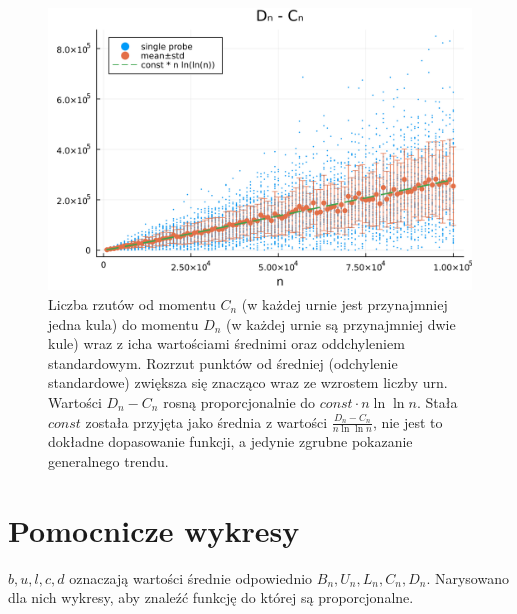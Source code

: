 \documentclass{article}
\begin{document}
\begin{figure}
    \centering
    \includegraphics[width=1.0\textwidth]{../results/D_n-C_n.png}
    \caption{Liczba rzutów od momentu $C_n$ (w każdej urnie jest przynajmniej jedna kula) do momentu $D_n$ (w każdej urnie są przynajmniej dwie kule) wraz z icha wartościami średnimi oraz oddchyleniem standardowym. Rozrzut punktów od średniej (odchylenie standardowe) zwiększa się znacząco wraz ze wzrostem liczby urn.  Wartości $D_n - C_n$ rosną proporcjonalnie do $const \cdot n \ln \ln n$. Stała $const$ została przyjęta jako średnia z wartości $\frac{D_n - C_n}{n \ln \ln n}$, nie jest to dokładne dopasowanie funkcji, a jedynie zgrubne pokazanie generalnego trendu.}
    \label{fig:D_n-C_n}
\end{figure}

\section{Pomocnicze wykresy}
$b, u, l, c, d$ oznaczają wartości średnie odpowiednio $B_n, U_n, L_n, C_n, D_n$. Narysowano dla nich wykresy, aby znaleźć funkcję do której są proporcjonalne.
\end{document}
